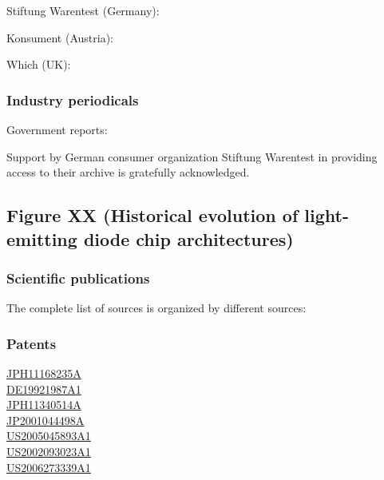 \documentclass{article}
\begin{document}
Stiftung Warentest (Germany): \cite{Warentest2008}\cite{Warentest2009_1}\cite{Warentest2009_2}\cite{Warentest2010_1}\cite{Warentest2010_2}\cite{Warentest2011}\cite{Warentest2012}\cite{Warentest2013}\cite{Warentest2014_1}\cite{Warentest2014_2}\cite{Warentest2015}\cite{Warentest2016_1}\cite{Warentest2016_2}\cite{Warentest2018}

Konsument (Austria): \cite{Konsument2010}

Which (UK): \cite{Which2020}

\subsubsection{Industry periodicals}

\cite{PM2020}

Government reports:

\cite{council2013assessment}

Support by German consumer organization Stiftung Warentest in providing access to their archive is gratefully acknowledged.

\subsection{Figure XX (Historical evolution of light-emitting diode chip architectures)}

\subsubsection{Scientific publications}

The complete list of sources is organized by different sources:

\cite{plossl2010wafer}\cite{bierhuizen2007performance}\cite{gencc2019distributed}\cite{chong2014performance}

\subsubsection{Patents}

\href{https://worldwide.espacenet.com/patent/search?q=pn\%3DJPH11168235A}{JPH11168235A} \\
\href{https://worldwide.espacenet.com/patent/search?q=pn\%3DDE19921987A1}{DE19921987A1} \\
\href{https://worldwide.espacenet.com/patent/search?q=pn\%3DJPH11340514A}{JPH11340514A} \\
\href{https://worldwide.espacenet.com/patent/search?q=pn\%3DJP2001044498A}{JP2001044498A} \\ 
\href{https://worldwide.espacenet.com/patent/search?q=pn\%3DUS2005045893A1}{US2005045893A1} \\ 
\href{https://worldwide.espacenet.com/patent/search?q=pn\%3DUS2002093023A1}{US2002093023A1} \\
\href{https://worldwide.espacenet.com/patent/search?q=pn\%3DUS2006273339A1}{US2006273339A1} 
\end{document}
